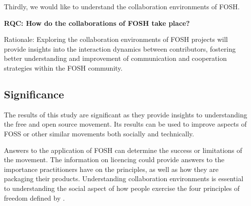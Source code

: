 \documentclass[final-report.tex]{subfiles}
\begin{document}
    \label{RQB}

Thirdly, we would like to understand the collaboration environments of FOSH.

    \textbf{RQC: How do the collaborations of FOSH take place?}
    
Rationale: Exploring the collaboration environments of FOSH projects will provide insights into the interaction dynamics between contributors, fostering better understanding and improvement of communication and cooperation strategies within the FOSH community.

    \label{RQC}
\subsection{Significance}
The results of this study are significant as they provide insights to understanding the free and open source movement. 
Its results can be used to improve aspects of FOSS or other similar movements both socially and technically. 

Answers to the application of FOSH can determine the success or limitations of the movement.
The information on licencing could provide answers to the importance practitioners have on the principles, as well as how they are packaging their products. 
Understanding collaboration environments is essential to understanding the social aspect of how people exercise the four principles of freedom defined by \cite{b0_stallman}.

\end{document}
